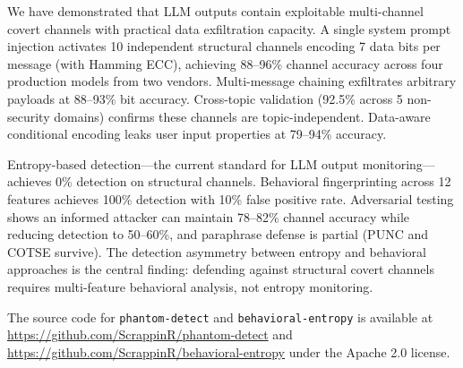 \documentclass[11pt]{article}
\begin{document}
We have demonstrated that LLM outputs contain exploitable multi-channel
covert channels with practical data exfiltration capacity. A single system
prompt injection activates 10 independent structural channels encoding 7
data bits per message (with Hamming ECC), achieving 88--96\% channel
accuracy across four production models from two vendors. Multi-message
chaining exfiltrates arbitrary payloads at 88--93\% bit accuracy.
Cross-topic validation (92.5\% across 5 non-security domains) confirms
these channels are topic-independent. Data-aware conditional encoding
leaks user input properties at 79--94\% accuracy.

Entropy-based detection---the current standard for LLM output
monitoring---achieves 0\% detection on structural channels. Behavioral
fingerprinting across 12 features achieves 100\% detection with 10\% false
positive rate. Adversarial testing shows an informed attacker can maintain
78--82\% channel accuracy while reducing detection to 50--60\%, and
paraphrase defense is partial (PUNC and COTSE survive). The detection
asymmetry between entropy and behavioral approaches is the central finding:
defending against structural covert channels requires multi-feature
behavioral analysis, not entropy monitoring.

The source code for \texttt{phantom-detect} and
\texttt{behavioral-entropy} is available at
\url{https://github.com/ScrappinR/phantom-detect} and
\url{https://github.com/ScrappinR/behavioral-entropy} under the Apache 2.0
license.



\end{document}
